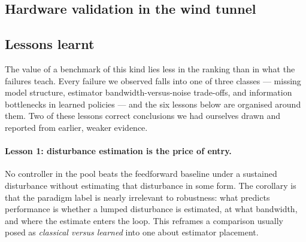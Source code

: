 \subsection{Hardware validation in the wind tunnel}
\label{sec:results:hardware}


\subsection{Lessons learnt}
\label{sec:results:lessons}

The value of a benchmark of this kind lies less in the ranking than in what the failures
teach. Every failure we observed falls into one of three classes --- missing model
structure, estimator bandwidth-versus-noise trade-offs, and information bottlenecks in
learned policies --- and the six lessons below are organised around them. Two of these
lessons correct conclusions we had ourselves drawn and reported from earlier, weaker
evidence.

\paragraph{Lesson 1: disturbance estimation is the price of entry.}
No controller in the pool beats the feedforward baseline under a sustained disturbance
without estimating that disturbance in some form. The corollary is that the paradigm
label is nearly irrelevant to robustness: what predicts performance is whether a lumped
disturbance is estimated, at what bandwidth, and where the estimate enters the loop.
This reframes a comparison usually posed as \emph{classical versus learned} into one
about estimator placement.


